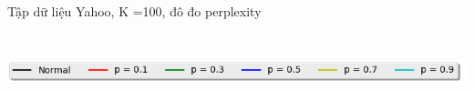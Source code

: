 \documentclass[pdf]{beamer}
\begin{document}
\begin{frame}{Tập dữ liệu Yahoo, K =100, đô đo perplexity}
\begin{columns}[T] %
	\begin{column}{.50\textwidth}
		\begin{figure}
		\end{figure}
	\end{column} %
	\hfill%
	\begin{column}{.50\textwidth}
		\begin{figure}
		\end{figure}				
	\end{column} %
\end{columns}
\begin{center}
	\includegraphics[width=1\textwidth]{menu.png}	
\end{center}
\end{frame}
\end{document}
